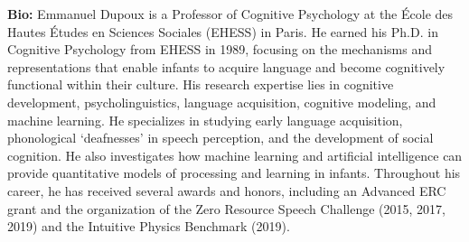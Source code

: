{\textbf{Bio:}}
Emmanuel Dupoux is a Professor of Cognitive Psychology at the École des Hautes Études en Sciences Sociales (EHESS) in Paris. He earned his Ph.D. in Cognitive Psychology from EHESS in 1989, focusing on the mechanisms and representations that enable infants to acquire language and become cognitively functional within their culture. His research expertise lies in cognitive development, psycholinguistics, language acquisition, cognitive modeling, and machine learning. He specializes in studying early language acquisition, phonological ‘deafnesses’ in speech perception, and the development of social cognition. He also investigates how machine learning and artificial intelligence can provide quantitative models of processing and learning in infants. Throughout his career, he has received several awards and honors, including an Advanced ERC grant and the organization of the Zero Resource Speech Challenge (2015, 2017, 2019) and the Intuitive Physics Benchmark (2019).\\

\clearpage